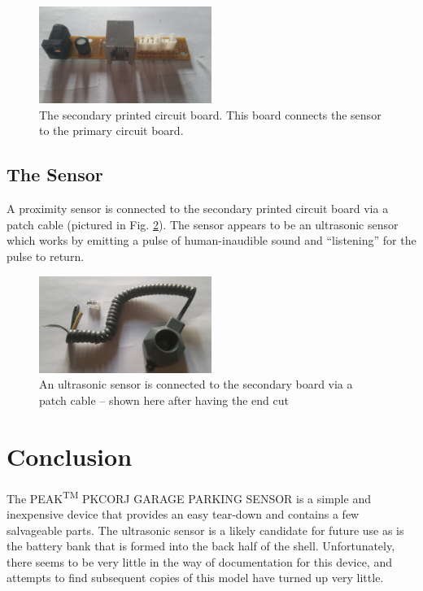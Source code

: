 \documentclass[journal]{IEEEtran}
\begin{document}
\begin{figure}[h]
  \includegraphics[width=0.5\textwidth]{img/img8.jpg}
  \caption{The secondary printed circuit board. This board connects the sensor to the 
  primary circuit board.}
  \label{fig:img8}
\end{figure}

\subsection{The Sensor}
A proximity sensor is connected to the secondary printed circuit board via a patch cable (pictured in Fig. \ref{fig:img10}). 
The sensor appears to be an ultrasonic sensor which works by emitting a pulse of human-inaudible sound and ``listening'' for
the pulse to return. 

\begin{figure}[h!]
  \includegraphics[width=0.5\textwidth]{img/img10.jpg}
  \caption{An ultrasonic sensor is connected to the secondary board via a patch cable -- shown here after having the end cut}
  \label{fig:img10}
\end{figure}
\FloatBarrier


\section{Conclusion}
The PEAK\textsuperscript{TM} PKCORJ GARAGE PARKING SENSOR is a simple and inexpensive device that provides an easy tear-down and contains a few salvageable parts. The ultrasonic sensor is a likely candidate for future use as is the battery bank that is
formed into the back half of the shell. Unfortunately, there seems to be very little in the way of documentation for this device, 
and attempts to find subsequent copies of this model have turned up very little.
\end{document}
